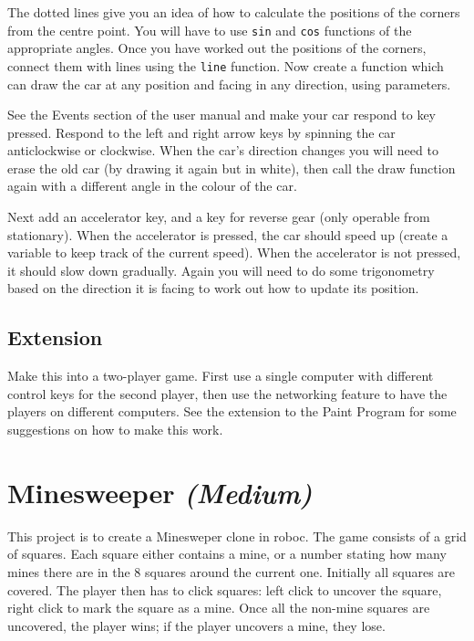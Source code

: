 \documentclass[12pt,a4paper,twoside]{article}
\renewcommand{\_}{\texttt{\symbol{95}}}
\begin{document}
The dotted lines give you an idea of how to calculate the positions
of the corners from the centre point. You will have to use \verb^sin^ and
\verb^cos^ functions of the appropriate angles. Once you have worked out
the positions of the corners, connect them with lines using the \verb^line^
function. Now create a function which can draw the car at any position
and facing in any direction, using parameters.

See the Events section of the user manual and make your car respond to key pressed. Respond
to the left and right arrow keys by spinning the car anticlockwise
or clockwise. When the car's direction changes you will
need to erase the old car (by drawing it again but in white), then
call the draw function again with a different angle in the colour of the car.

Next add an accelerator key, and a key for reverse gear (only operable
from stationary). When the accelerator is pressed, the car should
speed up (create a variable to keep track of the current speed).
When the accelerator is not pressed, it should slow down gradually.
Again you will need to do some trigonometry based on the direction it
is facing to work out how to update its position.

\subsection{Extension}

Make this into a two-player game. First use a single computer with
different control keys for the second player, then use the networking
feature to have the players on different computers. See the extension
to the Paint Program for some suggestions on how to make this work.



\newpage
\section{Minesweeper \it{(Medium)}}

This project is to create a Minesweper clone in roboc. The game consists of a
grid of squares. Each square either contains a mine, or a number stating how
many mines there are in the 8 squares around the current one.  Initially all
squares are covered. The player then has to click squares: left click to
uncover the square, right click to mark the square as a mine.  Once all the
non-mine squares are uncovered, the player wins; if the player uncovers a mine,
they lose.
\end{document}
